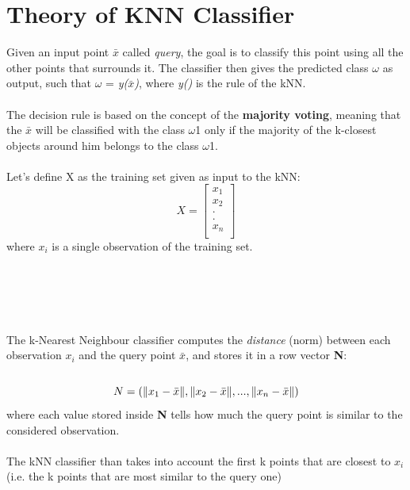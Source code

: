 \documentclass[10pt]{article}
\begin{document}
\section{Theory of KNN Classifier}
Given an input point $\bar{x}$ called \textit{query}, the goal is to classify
this point using all the other points that surrounds it. The
classifier then gives the predicted class $\omega$ as output, such that
$\omega$ = \textit{y($\bar{x}$)}, where \textit{y()} is the rule of the kNN.
\\\\The decision rule is based on the concept of the \textbf{majority voting}, meaning that the $\bar{x}$ will be classified with the class
$\omega$1 only if the majority of the k-closest objects around him belongs to the class $\omega$1.
\\\\Let’s define X as the training set given as input to the kNN:
\begin{equation}
    X =\begin{bmatrix}
            x_1\\
            x_2\\
            .\\
            .\\
            x_n\\
        \end{bmatrix}
\end{equation}
where $x_i$ is a single observation of the training set. \\\\\\\\\\\\The k-Nearest Neighbour classifier computes the \textit{distance} (norm) between each observation $x_i$ and the query point $\bar{x}$, and stores it in a row vector \textbf{N}:
\\\\
\begin{equation}
    N =\left( \lVert x_1 - \Bar{x} \rVert, \lVert x_2 - \Bar{x} \rVert,..., \lVert x_n - \Bar{x} \rVert\right)
\end{equation}
where each value stored inside \textbf{N} tells how much the query point is similar to the considered observation.\\\\
The kNN classifier than takes into account the first k points
that are closest to $x_i$ (i.e. the k points that are most similar to
the query one)
\end{document}
